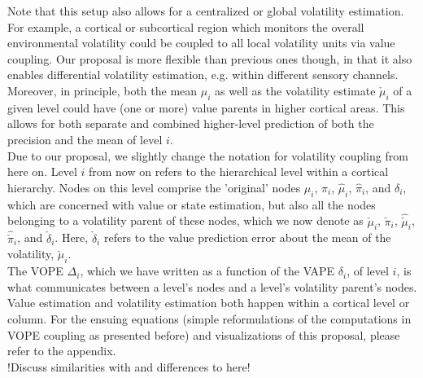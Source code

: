 Note that this setup also allows for a centralized or global volatility estimation. For example, a cortical or subcortical region which monitors the overall environmental volatility could be coupled to all local volatility units via value coupling. Our proposal is more flexible than previous ones \cite{Kanai2015} though, in that it also enables differential volatility estimation, e.g. within different sensory channels. \\

Moreover, in principle, both the mean $\mu_i$ as well as the volatility estimate $\check{\mu}_i$ of a given level could have (one or more) value parents in higher cortical areas. This allows for both separate and combined higher-level prediction of both the precision and the mean of level $i$.\\

Due to our proposal, we slightly change the notation for volatility coupling from here on. Level $i$ from now on refers to the hierarchical level within a cortical hierarchy. Nodes on this level comprise the 'original' nodes $\mu_i$, $\pi_i$, $\hat{\mu}_i$, $\hat{\pi}_i$, and $\delta_i$, which are concerned with value or state estimation, but also all the nodes belonging to a volatility parent of these nodes, which we now denote as $\check{\mu}_i$, $\check{\pi}_i$, $\hat{\check{\mu}}_i$, $\hat{\check{\pi}}_i$, and $\check{\delta}_i$. Here, $\check{\delta}_i$ refers to the value prediction error about the mean of the volatility, $\check{\mu}_i$. \\

The \textsf{VOPE} $\Delta_i$, which we have written as a function of the \textsf{VAPE} $\delta_i$, of level $i$, is what communicates between a level's nodes and a level's volatility parent's nodes. Value estimation and volatility estimation both happen within a cortical level or column. For the ensuing equations (simple reformulations of the computations in \textsf{VOPE} coupling as presented before) and visualizations of this proposal, please refer to the appendix. \\

!Discuss similarities with and differences to \cite{Kanai2015} here!\\

